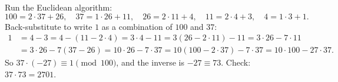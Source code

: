 Run the Euclidean algorithm:
\[100=2\cdot37+26,\quad 37=1\cdot26+11,\quad 26=2\cdot11+4,\quad 11=2\cdot4+3,\quad 4=1\cdot3+1.\]
Back-substitute to write $1$ as a combination of $100$ and $37$:
\[\begin{aligned}1&=4-3=4-(11-2\cdot4)=3\cdot4-11=3(26-2\cdot11)-11=3\cdot26-7\cdot11\\&=3\cdot26-7(37-26)=10\cdot26-7\cdot37=10(100-2\cdot37)-7\cdot37=10\cdot100-27\cdot37.\end{aligned}\]
So $37\cdot(-27)\equiv1\pmod{100}$, and the inverse is $-27\equiv\boxed{73}$. Check: $37\cdot73=2701$.
